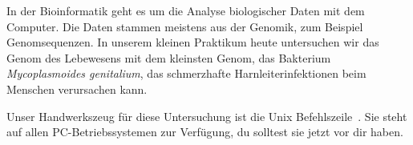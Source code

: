 In der Bioinformatik geht es um die Analyse biologischer Daten mit dem
Computer. Die Daten stammen meistens aus der Genomik, zum Beispiel
Genomsequenzen. In unserem kleinen Praktikum heute untersuchen wir das
Genom des Lebewesens mit dem kleinsten Genom, das Bakterium
\emph{Mycoplasmoides genitalium}, das schmerzhafte
Harnleiterinfektionen beim Menschen verursachen kann.

Unser Handwerkszeug für diese Untersuchung ist die Unix
Befehlszeile~\cite{ker20:uni}. Sie steht auf allen PC-Betriebssystemen
zur Verfügung, du solltest sie jetzt vor dir haben.
